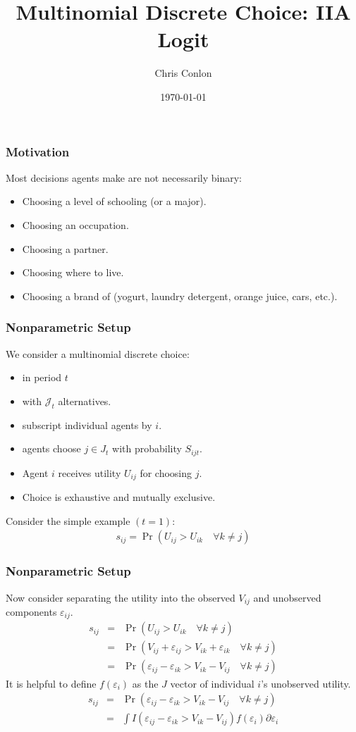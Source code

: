 

\title{Multinomial Discrete Choice: IIA Logit}
\author{Chris Conlon}
\date{\today}

\frame{\titlepage}


\begin{frame}
\frametitle{Motivation}
Most decisions agents make are not necessarily binary:
\begin{itemize}
\item Choosing a level of schooling (or a major).
\item Choosing an occupation.
\item Choosing a partner.
\item Choosing where to live.
\item Choosing a brand of (yogurt, laundry detergent, orange juice, cars, etc.).
 \end{itemize}
\end{frame}

\begin{frame}
\frametitle{Nonparametric Setup}
We consider a \alert{multinomial discrete choice}:
\begin{itemize}
\item in period $t$
\item with $\mathcal{J}_t$ alternatives.
\item subscript individual agents by $i$.
\item agents choose $j \in J_t$ with probability $S_{ijt}$.
\item Agent $i$ receives utility $U_{ij}$ for choosing $j$.
\item Choice is exhaustive and mutually exclusive.
 \end{itemize}\pause
Consider the simple example $(t=1)$:
\begin{eqnarray*}
s_{ij} = \Pr( U_{ij} > U_{ik} \quad \forall k \neq j)
\end{eqnarray*}
\end{frame}

\begin{frame}
\frametitle{Nonparametric Setup}
Now consider separating the utility into the \alert{observed} $V_{ij}$ and \alert{unobserved} components $\varepsilon_{ij}$.
\begin{eqnarray*}
s_{ij} &=& \Pr( U_{ij} > U_{ik} \quad \forall k \neq j)\\
 &=& \Pr( V_{ij} + \varepsilon_{ij} > V_{ik} + \varepsilon_{ik} \quad \forall k \neq j)\\
 &=& \Pr( \varepsilon_{ij}-\varepsilon_{ik} > V_{ik} - V_{ij} \quad \forall k \neq j)
\end{eqnarray*}
\pause
It is helpful to define $f(\varepsilon_{i})$ as the $J$ vector of individual $i$'s unobserved utility.
\begin{eqnarray*}
s_{ij} &=& \Pr( \varepsilon_{ij}-\varepsilon_{ik} > V_{ik} - V_{ij} \quad \forall k \neq j)\\
&=& \int I( \varepsilon_{ij}-\varepsilon_{ik} > V_{ik} - V_{ij} ) f( \varepsilon_i) \partial \varepsilon_i \\
\end{eqnarray*}
\end{frame}

